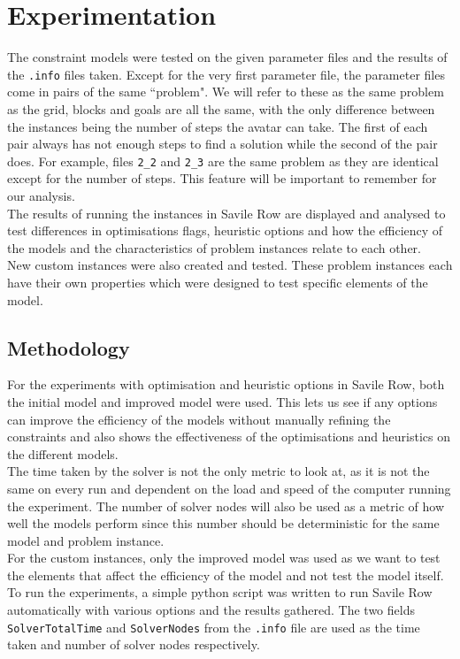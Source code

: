 \documentclass{article}
\newcommand{\n}[0]{\\[\baselineskip]}
\begin{document}
\section{Experimentation}
The constraint models were tested on the given parameter files and the results of the \texttt{.info} files taken. Except for the very first parameter file, the parameter files come in pairs of the same ``problem". We will refer to these as the same problem as the grid, blocks and goals are all the same, with the only difference between the instances being the number of steps the avatar can take. The first of each pair always has not enough steps to find a solution while the second of the pair does. For example, files \texttt{2\_2} and \texttt{2\_3} are the same problem as they are identical except for the number of steps. This feature will be important to remember for our analysis. 
\n
The results of running the instances in Savile Row are displayed and analysed to test differences in optimisations flags, heuristic options and how the efficiency of the models and the characteristics of problem instances relate to each other. 
\n
New custom instances were also created and tested. These problem instances each have their own properties which were designed to test specific elements of the model.


\subsection{Methodology}
For the experiments with optimisation and heuristic options in Savile Row, both the initial model and improved model were used. This lets us see if any options can improve the efficiency of the models without manually refining the constraints and also shows the effectiveness of the optimisations and heuristics on the different models.
\n
The time taken by the solver is not the only metric to look at, as it is not the same on every run and dependent on the load and speed of the computer running the experiment. The number of solver nodes will also be used as a metric of how well the models perform since this number should be deterministic for the same model and problem instance. 
\n
For the custom instances, only the improved model was used as we want to test the elements that affect the efficiency of the model and not test the model itself. 
\n
To run the experiments, a simple python script was written to run Savile Row automatically with various options and the results gathered. The two fields \texttt{SolverTotalTime} and \texttt{SolverNodes} from the \texttt{.info} file are used as the time taken and number of solver nodes respectively.
\end{document}
